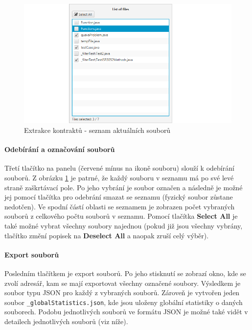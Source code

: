 			\begin{figure}[!htb]
					\centering
					\includegraphics[width=1\textwidth]{img/guide02.png}
					\caption[guide02]{Extrakce kontraktů - seznam aktuálních souborů}
					\label{guide02}
				\endminipage\hfill
			\end{figure}			
			
				\paragraph{Odebírání a označování souborů}
					Třetí tlačítko na panelu (červené mínus na ikoně souboru) slouží k odebírání souborů. Z obrázku \ref{guide02} je patrné, že každý souboru v seznamu má po své levé straně zaškrtávací pole. Po jeho vybrání je soubor označen a následně je možné jej pomocí tlačítka pro odebrání smazat se seznamu (fyzický soubor zůstane nedotčen). Ve spodní částí oblasti se seznamem je zobrazen počet vybraných souborů z celkového počtu souborů v seznamu. Pomocí tlačítka \textbf{Select All} je také možné vybrat všechny soubory najednou (pokud již jsou všechny vybrány, tlačítko změní popisek na \textbf{Deselect All} a naopak zruší celý výběr).\\
			
				\paragraph{Export souborů}
					Posledním tlačítkem je export souborů. Po jeho stisknutí se zobrazí okno, kde se zvolí adresář, kam se mají exportovat všechny označené soubory. Výsledkem je soubor typu JSON pro každý z vybraných souborů. Zároveň je vytvořen jeden soubor \texttt{\_globalStatistics.json}, kde jsou uloženy globální statistiky o daných souborech. Podobu jednotlivých souborů ve formátu JSON je možné také vidět v detailech jednotlivých souborů (viz níže).\\
			
